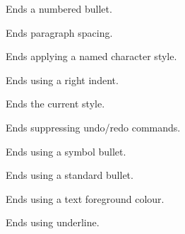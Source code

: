 
Ends a numbered bullet.

\label{wxrichtextbufferendparagraphspacing}


Ends paragraph spacing.

\label{wxrichtextbufferendparagraphstyle}


Ends applying a named character style.

\label{wxrichtextbufferendrightindent}


Ends using a right indent.

\label{wxrichtextbufferendstyle}


Ends the current style.

\label{wxrichtextbufferendsuppressundo}


Ends suppressing undo/redo commands.

\label{wxrichtextbufferendsymbolbullet}


Ends using a symbol bullet.

\label{wxrichtextbufferendstandardbullet}


Ends using a standard bullet.

\label{wxrichtextbufferendtextcolour}


Ends using a text foreground colour.

\label{wxrichtextbufferendunderline}


Ends using underline.

